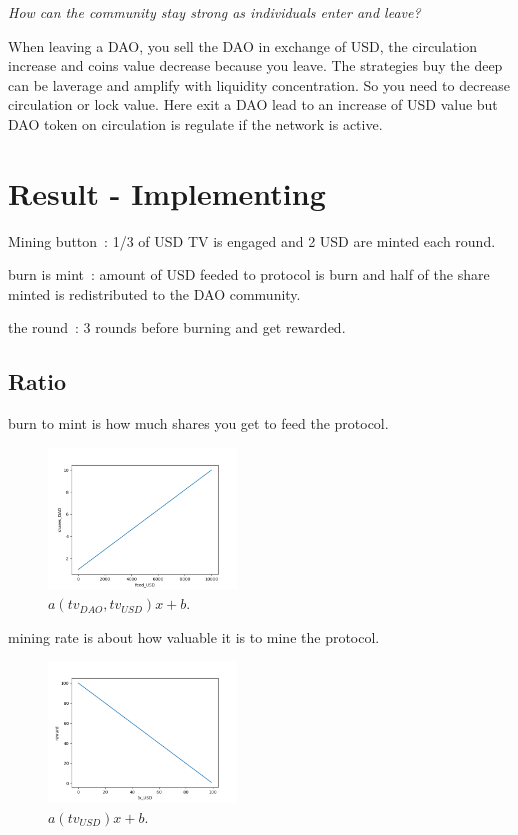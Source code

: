 \documentclass{article}
\begin{document}
\begin{multicols}{2}[]
\emph{How can the community stay strong as individuals enter and leave?}

When leaving a DAO, you sell the DAO in exchange of USD, the circulation increase and coins value decrease because you leave. The strategies buy the deep can be laverage and amplify with liquidity concentration. So you need to decrease circulation or lock value. 
Here exit a DAO lead to an increase of USD value but DAO token on circulation is regulate if the network is active.

\section{Result - Implementing}
Mining button : 1/3 of USD TV is engaged and 2 USD are minted each round.

burn is mint : amount of USD feeded to protocol is burn and half of the share minted is redistributed to the DAO community.

the round : 3 rounds before burning and get rewarded.

\subsection{Ratio}
burn to mint is how much shares you get to feed the protocol.
\begin{figure}[H]
\centering\includegraphics[width=5cm]{figure1}
\caption{$a(tv_{DAO}, tv_{USD})x + b$.}
\end{figure}
mining rate is about how valuable it is to mine the protocol.
\begin{figure}[H]
\centering\includegraphics[width=5cm]{figure2}
\caption{$a(tv_{USD})x + b$.}
\end{figure}


\end{multicols}
\end{document}
